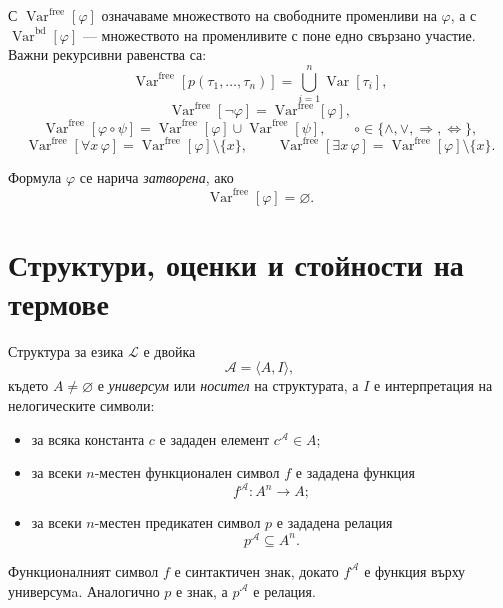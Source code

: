 С $\operatorname{Var}^{\mathrm{free}}[\varphi]$ означаваме множеството на свободните променливи на $\varphi$, а с $\operatorname{Var}^{\mathrm{bd}}[\varphi]$ --- множеството на променливите с поне едно свързано участие. Важни рекурсивни равенства са:
\[
\operatorname{Var}^{\mathrm{free}}[p(\tau_1,\ldots,\tau_n)]
=\bigcup_{i=1}^{n}\operatorname{Var}[\tau_i],
\]
\[
\operatorname{Var}^{\mathrm{free}}[\neg\varphi]
=\operatorname{Var}^{\mathrm{free}}[\varphi],
\]
\[
\operatorname{Var}^{\mathrm{free}}[\varphi\circ\psi]
=\operatorname{Var}^{\mathrm{free}}[\varphi]\cup
\operatorname{Var}^{\mathrm{free}}[\psi],
\qquad
\circ\in\{\wedge,\vee,\Rightarrow,\Leftrightarrow\},
\]
\[
\operatorname{Var}^{\mathrm{free}}[\forall x\,\varphi]
=\operatorname{Var}^{\mathrm{free}}[\varphi]\setminus\{x\},
\qquad
\operatorname{Var}^{\mathrm{free}}[\exists x\,\varphi]
=\operatorname{Var}^{\mathrm{free}}[\varphi]\setminus\{x\}.
\]

\begin{defn}
Формула $\varphi$ се нарича \emph{затворена}, ако
\[
\operatorname{Var}^{\mathrm{free}}[\varphi]=\varnothing.
\]
\end{defn}

\section{Структури, оценки и стойности на термове}\label{s:21.2}

\begin{defn}
Структура за езика $\mathcal L$ е двойка
\[
\mathcal A=\langle A,I\rangle,
\]
където $A\neq\varnothing$ е \emph{универсум} или \emph{носител} на структурата, а $I$ е интерпретация на нелогическите символи:
\begin{itemize}
\item за всяка константа $c$ е зададен елемент $c^{\mathcal A}\in A$;
\item за всеки $n$-местен функционален символ $f$ е зададена функция
\[
f^{\mathcal A}:A^n\to A;
\]
\item за всеки $n$-местен предикатен символ $p$ е зададена релация
\[
p^{\mathcal A}\subseteq A^n.
\]
\end{itemize}
\end{defn}

\begin{remark}
Функционалният символ $f$ е синтактичен знак, докато $f^{\mathcal A}$ е функция върху универсумa. Аналогично $p$ е знак, а $p^{\mathcal A}$ е релация.
\end{remark}

